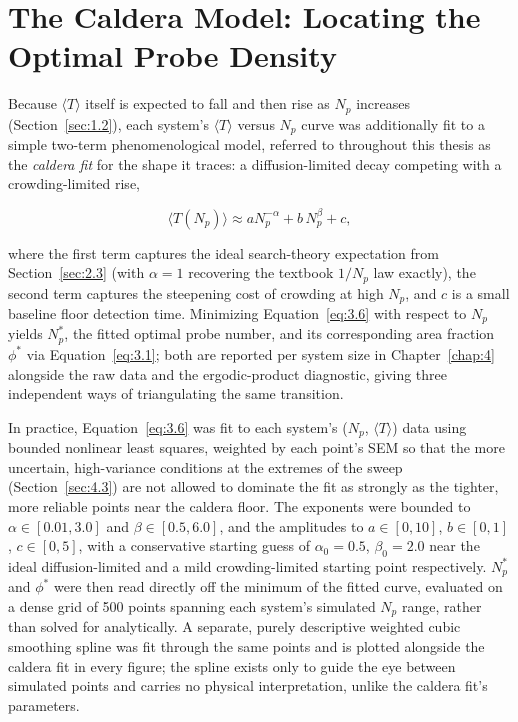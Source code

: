 \section{The Caldera Model: Locating the Optimal Probe Density}
\label{sec:3.10}
Because $\langle T \rangle$ itself is expected to fall and then rise as $N_p$ increases (Section~\ref{sec:1.2}), each system's $\langle T \rangle$ versus $N_p$ curve was additionally fit to a simple two-term phenomenological model, referred to throughout this thesis as the \emph{caldera fit} for the shape it traces: a diffusion-limited decay competing with a crowding-limited rise,

\begin{equation}
  \langle T(N_p) \rangle \approx {a}{N_p^{-\alpha}} + b\,N_p^{\beta} + c,
  \label{eq:3.6}
\end{equation}

where the first term captures the ideal search-theory expectation from Section~\ref{sec:2.3} (with $\alpha = 1$ recovering the textbook $1/N_p$ law exactly), the second term captures the steepening cost of crowding at high $N_p$, and $c$ is a small baseline floor detection time. Minimizing Equation~\ref{eq:3.6} with respect to $N_p$ yields $N_p^{*}$, the fitted optimal probe number, and its corresponding area fraction $\phi^{*}$ via Equation~\ref{eq:3.1}; both are reported per system size in Chapter~\ref{chap:4} alongside the raw data and the ergodic-product diagnostic, giving three independent ways of triangulating the same transition.

In practice, Equation~\ref{eq:3.6} was fit to each system's ($N_p$, $\langle T \rangle$) data using bounded nonlinear least squares, weighted
by each point's SEM so that the more uncertain, high-variance conditions at the extremes of the sweep (Section~\ref{sec:4.3}) are not allowed to dominate the fit as strongly as the tighter, more reliable points near the caldera floor. The exponents were bounded to $\alpha \in [0.01, 3.0]$ and $\beta \in [0.5, 6.0]$, and the amplitudes to $a \in [0,10]$, $b \in [0,1]$, $c \in [0,5]$, with a conservative starting guess of $\alpha_0 = 0.5$, $\beta_0 = 2.0$ near the ideal diffusion-limited and a mild crowding-limited starting point respectively. $N_p^{*}$ and $\phi^{*}$ were then read directly off the minimum of the fitted curve, evaluated on a dense grid of 500 points spanning each system's simulated $N_p$ range, rather than solved for analytically. A separate, purely descriptive weighted cubic smoothing spline was fit through the same points and is plotted alongside the caldera fit in every figure; the spline exists only to guide the eye between simulated points and carries no physical interpretation, unlike the caldera fit's parameters.

